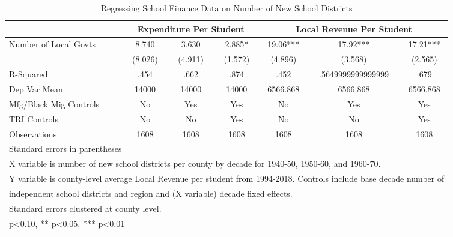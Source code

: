 \begin{table}[htbp]\centering
\def\sym#1{\ifmmode^{#1}\else\(^{#1}\)\fi}
\caption{Regressing School Finance Data on Number of New School Districts}
\begin{tabular}{l*{6}{c}}
\toprule
                &\multicolumn{3}{c}{Expenditure Per Student}&\multicolumn{3}{c}{Local Revenue Per Student}\\\cmidrule(lr){2-4}\cmidrule(lr){5-7}
\midrule
Number of Local Govts&    8.740   &    3.630   &    2.885*  &    19.06***&    17.92***&    17.21***\\
                &  (8.026)   &  (4.911)   &  (1.572)   &  (4.896)   &  (3.568)   &  (2.565)   \\
\midrule
R-Squared       &     .454   &     .662   &     .874   &     .452   &.5649999999999999   &     .679   \\
Dep Var Mean    &    14000   &    14000   &    14000   & 6566.868   & 6566.868   & 6566.868   \\
Mfg/Black Mig Controls&       No   &      Yes   &      Yes   &       No   &      Yes   &      Yes   \\
TRI Controls    &       No   &       No   &      Yes   &       No   &       No   &      Yes   \\
Observations    &     1608   &     1608   &     1608   &     1608   &     1608   &     1608   \\
\bottomrule
\multicolumn{7}{l}{\footnotesize Standard errors in parentheses}\\
\multicolumn{7}{l}{\footnotesize X variable is number of new school districts per county by decade for 1940-50, 1950-60, and 1960-70.}\\
\multicolumn{7}{l}{\footnotesize Y variable is county-level average Local Revenue per student from 1994-2018. Controls include base decade number of }\\
\multicolumn{7}{l}{\footnotesize independent school districts and region and (X variable) decade fixed effects.}\\
\multicolumn{7}{l}{\footnotesize Standard errors clustered at county level.}\\
\multicolumn{7}{l}{\footnotesize * p<0.10, ** p<0.05, *** p<0.01}\\
\end{tabular}
\end{table}
